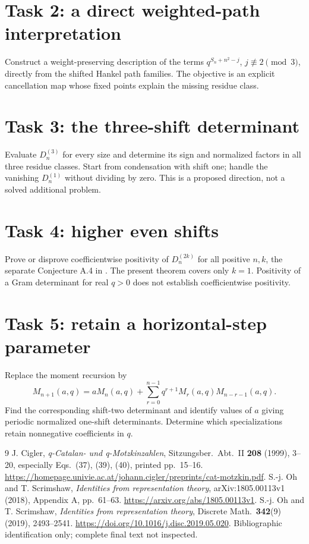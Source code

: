\documentclass[11pt]{article}
\begin{document}
\section*{Task 2: a direct weighted-path interpretation}
Construct a weight-preserving description of the terms
\(q^{S_n+n^2-j}\), \(j\not\equiv2\pmod3\), directly from the
shifted Hankel path families. The objective is an explicit cancellation
map whose fixed points explain the missing residue class.

\section*{Task 3: the three-shift determinant}
Evaluate \(D_n^{(3)}\) for every size and determine its sign and
normalized factors in all three residue classes. Start from condensation
with shift one; handle the vanishing \(D_n^{(1)}\) without dividing by
zero. This is a proposed direction, not a solved additional problem.

\section*{Task 4: higher even shifts}
Prove or disprove coefficientwise positivity of \(D_n^{(2k)}\) for
all positive \(n,k\), the separate Conjecture A.4 in \cite{OS}.
The present theorem covers only \(k=1\). Positivity of a Gram
determinant for real \(q>0\) does not establish coefficientwise
positivity.

\section*{Task 5: retain a horizontal-step parameter}
Replace the moment recursion by
\[
 M_{n+1}(a,q)=aM_n(a,q)+
       \sum_{r=0}^{n-1}q^{r+1}M_r(a,q)M_{n-r-1}(a,q).
\]
Find the corresponding shift-two determinant and identify values of
\(a\) giving periodic normalized one-shift determinants. Determine
which specializations retain nonnegative coefficients in \(q\).

\begin{thebibliography}{9}
J. Cigler, \emph{q-Catalan- und q-Motzkinzahlen},
Sitzungsber.\ Abt.\ II \textbf{208} (1999), 3--20,
especially Eqs.~(37), (39), (40), printed pp.~15--16.
\url{https://homepage.univie.ac.at/johann.cigler/preprints/cat-motzkin.pdf}.
S.-j. Oh and T. Scrimshaw, \emph{Identities from representation theory},
arXiv:1805.00113v1 (2018), Appendix A, pp.~61--63.
\url{https://arxiv.org/abs/1805.00113v1}.
S.-j. Oh and T. Scrimshaw, \emph{Identities from representation theory},
Discrete Math.\ \textbf{342}(9) (2019), 2493--2541.
\url{https://doi.org/10.1016/j.disc.2019.05.020}.
Bibliographic identification only; complete final text not inspected.
\end{thebibliography}
\end{document}
